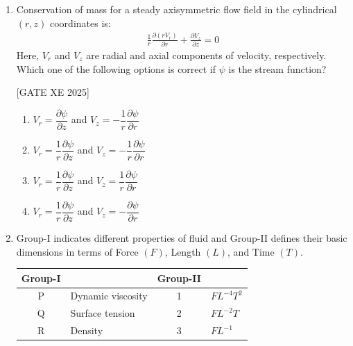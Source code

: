 \documentclass[journal,12pt,onecolumn]{IEEEtran}
\theoremstyle{remark}
\begin{document}
\begin{enumerate}
\hfill[GATE XE 2025]

\begin{multicols}{2}
\begin{enumerate}
\item 5
\item $-5$
\item 8
\item 2
\end{enumerate}
\end{multicols}


\item Conservation of mass for a steady axisymmetric flow field in the cylindrical $(r,z)$ coordinates is:
\begin{align}
\frac{1}{r}\frac{\partial (rV_r)}{\partial r}+\frac{\partial V_z}{\partial z}=0
\end{align}
Here, $V_r$ and $V_z$ are radial and axial components of velocity, respectively. Which one of the following options is correct if $\psi$ is the stream function? \label{q:27}

\hfill[GATE XE 2025]

\begin{multicols}{2}
\begin{enumerate}
\item $V_r=\dfrac{\partial \psi}{\partial z}$ and $V_z=-\dfrac{1}{r}\dfrac{\partial \psi}{\partial r}$
\item $V_r=\dfrac{1}{r}\dfrac{\partial \psi}{\partial z}$ and $V_z=-\dfrac{1}{r}\dfrac{\partial \psi}{\partial r}$
\item $V_r=\dfrac{1}{r}\dfrac{\partial \psi}{\partial z}$ and $V_z=\dfrac{1}{r}\dfrac{\partial \psi}{\partial r}$
\item $V_r=\dfrac{1}{r}\dfrac{\partial \psi}{\partial z}$ and $V_z=-\dfrac{\partial \psi}{\partial r}$
\end{enumerate}
\end{multicols}


\item Group-I indicates different properties of fluid and Group-II defines their basic dimensions in terms of Force $(F)$, Length $(L)$, and Time $(T)$. \\
\begin{center}
\begin{tabular}{|c|l|c|l|}
\hline
\textbf{Group-I} & & \textbf{Group-II} & \\
\hline
P & Dynamic viscosity & 1 & $FL^{-4}T^2$ \\
Q & Surface tension    & 2 & $FL^{-2}T$ \\
R & Density            & 3 & $FL^{-1}$ \\
\hline
\end{tabular}
\end{center}


\end{enumerate}
\end{document}
